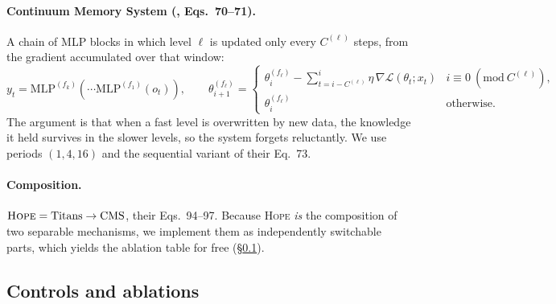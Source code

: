 \documentclass[11pt,a4paper]{article}
\begin{document}
\paragraph{Continuum Memory System (\cite[\S7.1]{behrouz2025nested}, Eqs.\
70--71).} A chain of MLP blocks in which level $\ell$ is updated only every
$C^{(\ell)}$ steps, from the gradient accumulated over that window:
\begin{equation}
y_t = \mathrm{MLP}^{(f_k)}\!\left(\cdots \mathrm{MLP}^{(f_1)}(o_t)\right),
\qquad
\theta^{(f_\ell)}_{i+1} =
\begin{cases}
\theta^{(f_\ell)}_i - \sum_{t=i-C^{(\ell)}}^{i}\eta\,\nabla\mathcal{L}(\theta_t;x_t)
   & i \equiv 0 \ (\mathrm{mod}\ C^{(\ell)}),\\[2pt]
\theta^{(f_\ell)}_i & \text{otherwise.}
\end{cases}
\label{eq:cms}
\end{equation}
The argument is that when a fast level is overwritten by new data, the knowledge
it held survives in the slower levels, so the system forgets reluctantly. We use
periods $(1,4,16)$ and the sequential variant of their Eq.~73.

\paragraph{Composition.} $\textsc{Hope} = \text{Titans} \rightarrow \text{CMS}$,
their Eqs.~94--97. Because \textsc{Hope} \emph{is} the composition of two
separable mechanisms, we implement them as independently switchable parts, which
yields the ablation table for free (\S\ref{sec:variants}).

\subsection{Controls and ablations}
\label{sec:variants}
\end{document}
